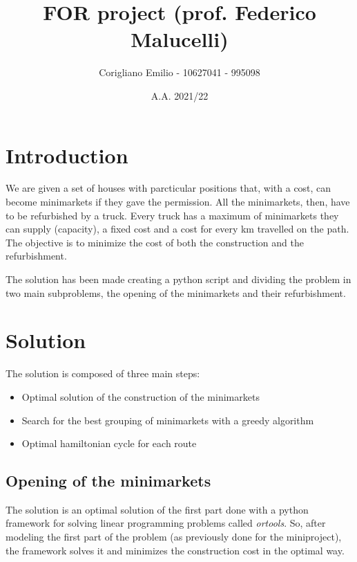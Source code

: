 \documentclass[11pt]{article} %
\title{FOR project (prof. Federico Malucelli)}
\author{Corigliano Emilio - 10627041 - 995098}
\date{A.A. 2021/22} %
\begin{document}
\maketitle

\section{Introduction}
We are given a set of houses with parcticular positions that, with a cost, can become minimarkets if they gave the permission. All the minimarkets, then, have to be refurbished by a truck. Every truck has a maximum of minimarkets they can supply (capacity), a fixed cost and a cost for every km travelled on the path. The objective is to minimize the cost of both the construction and the refurbishment.

The solution has been made creating a python script and dividing the problem in two main subproblems, the opening of the minimarkets and their refurbishment.

\section{Solution}
The solution is composed of three main steps:
\begin{itemize}
\item Optimal solution of the construction of the minimarkets
\item Search for the best grouping of minimarkets with a greedy algorithm
\item Optimal hamiltonian cycle for each route
\end{itemize}

\subsection{Opening of the minimarkets}
The solution is an optimal solution of the first part done with a python framework for solving linear programming problems called \textit{ortools}. So, after modeling the first part of the problem (as previously done for the miniproject), the framework solves it and minimizes the construction cost in the optimal way.
\end{document}
